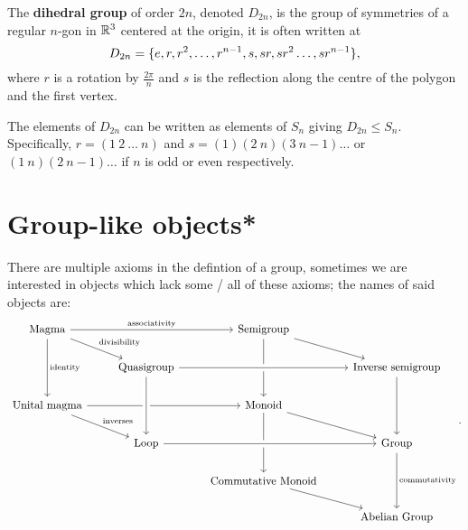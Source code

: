 \documentclass[../Year1/Year1.tex]{subfiles}
\begin{document}
\begin{definition}
    The \textbf{dihedral group} of order $2n$, denoted $D_{2n}$, is the group of symmetries of a regular $n$-gon in $\mathbb{R}^3$ centered at the origin, it is often written at \[
        D_{2n} = \{e,r,r^2,\ldots,r^{n-1},s,sr,sr^2\ldots,sr^{n-1}\}
    \textcolor{black}{,}
    \] where $r$ is a rotation by $\frac{2\pi}{n}$ and $s$ is the reflection along the centre of the polygon and the first vertex.
\end{definition}

\begin{theorem}
    The elements of $D_{2n}$ can be written as elements of $S_n$ giving $D_{2n}\leq S_n$. Specifically, $r = (1 \ 2 \ \ldots \ n)$ and $s = (1)(2 \ n)(3 \ n-1)\ldots$ or $(1 \ n)(2 \ n-1)\ldots$ if $n$ is odd or even respectively.
\end{theorem}

\section{Group-like objects*}

\begin{definition}
    There are multiple axioms in the defintion of a group, sometimes we are interested in objects which lack some / all of these axioms; the names of said objects are:
    \[
        \begin{tikzcd}
            \text{Magma} \arrow[rr, "\text{associativity}"] \arrow[rd, "\text{divisibility}"] \arrow[dd, "\text{identity}"] & & \text{Semigroup} \arrow[rd] \arrow[dd] \\
            & \text{Quasigroup} \arrow[rr, crossing over] & & \text{Inverse semigroup} \arrow[dd]\\
            \text{Unital magma} \arrow[rr] \arrow[rd, "\text{inverses}"] & & \text{Monoid} \arrow[rd] \arrow[dd]\\
            & \text{Loop} \arrow[from=uu, crossing over] \arrow[rr, crossing over] & & \text{Group} \arrow[dd, "\text{commutativity}"]\\
            & & \text{Commutative Monoid} \arrow[rd] \\
            & & & \text{Abelian Group}
        \end{tikzcd}
    \textcolor{black}{.}
    \]
\end{definition}
\end{document}
